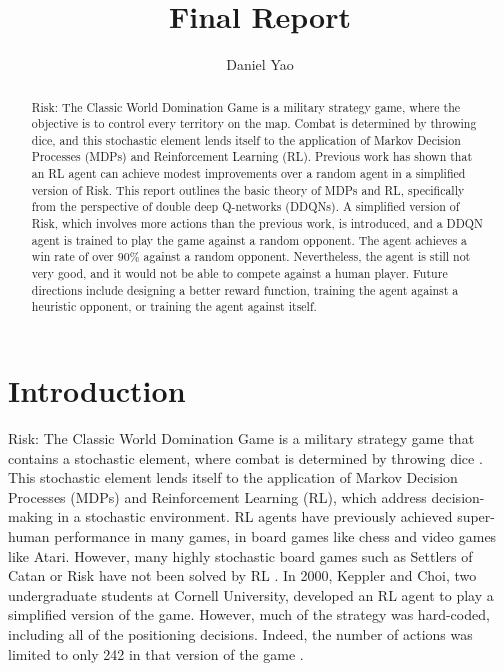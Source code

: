 \documentclass[final,5p,times,twocolumn]{elsarticle}
\begin{document}
\begin{frontmatter}

\title{Final Report}
\author{Daniel Yao}

\begin{abstract}
Risk: The Classic World Domination Game is a military strategy game, where the objective is to control every territory on the map. Combat is determined by throwing dice, and this stochastic element lends itself to the application of Markov Decision Processes (MDPs) and Reinforcement Learning (RL). Previous work has shown that an RL agent can achieve modest improvements over a random agent in a simplified version of Risk. This report outlines the basic theory of MDPs and RL, specifically from the perspective of double deep Q-networks (DDQNs). A simplified version of Risk, which involves more actions than the previous work, is introduced, and a DDQN agent is trained to play the game against a random opponent. The agent achieves a win rate of over $90\%$ against a random opponent. Nevertheless, the agent is still not very good, and it would not be able to compete against a human player. Future directions include designing a better reward function, training the agent against a heuristic opponent, or training the agent against itself.
\end{abstract}

\end{frontmatter}

\section{Introduction}
\label{sec:intro}

Risk: The Classic World Domination Game is a military strategy game that contains a stochastic element, where combat is determined by throwing dice \cite{risk1959}. This stochastic element lends itself to the application of Markov Decision Processes (MDPs) and Reinforcement Learning (RL), which address decision-making in a stochastic environment. RL agents have previously achieved super-human performance in many games, in board games like chess and video games like Atari. However, many highly stochastic board games such as Settlers of Catan or Risk have not been solved by RL \cite{pfeiffer2004reinforcement} \cite{lukin2020survey} \cite{mnih2015human} \cite{silver2017mastering} \cite{sutton1998reinforcement}. In 2000, Keppler and Choi, two undergraduate students at Cornell University, developed an RL agent to play a simplified version of the game. However, much of the strategy was hard-coded, including all of the positioning decisions. Indeed, the number of actions was limited to only 242 in that version of the game \cite{KepplerChoi2000Risk}.
\end{document}
